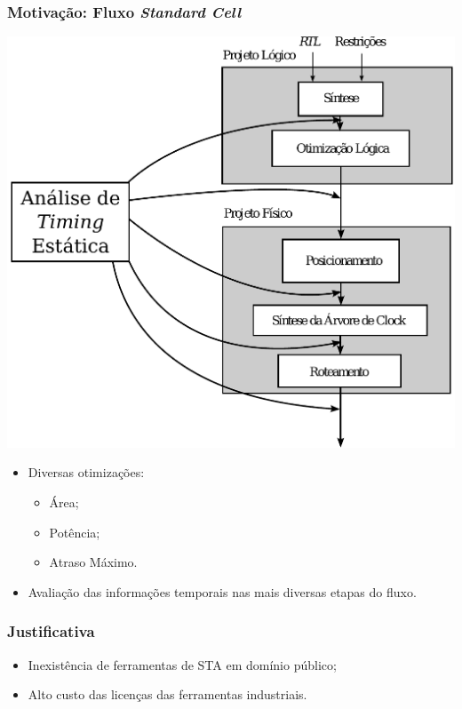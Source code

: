 \documentclass[10pt,a4paper]{beamer}
\begin{document}
			\begin{frame}
				\frametitle{Motivação: Fluxo \textit{Standard Cell}}
				\begin{minipage}{0.5 \textwidth}
					\includegraphics[width=\textwidth]{img/fluxo_standard_cell.pdf}
				\end{minipage}
				\begin{minipage}{0.4 \textwidth}
					\begin{itemize}
						\item Diversas otimizações:
							\begin{itemize}
								\item Área;
								\item Potência;
								\item Atraso Máximo.
								
							\end{itemize}
						\item Avaliação das informações temporais nas mais diversas etapas do fluxo.
					\end{itemize}
				\end{minipage}
				
			\end{frame}
		
			\begin{frame}
				\frametitle{Justificativa}
				\begin{itemize}
					\item Inexistência de ferramentas de STA em domínio público;
					\item Alto custo das licenças das ferramentas industriais.
				\end{itemize}
			\end{frame}
		
\end{document}
